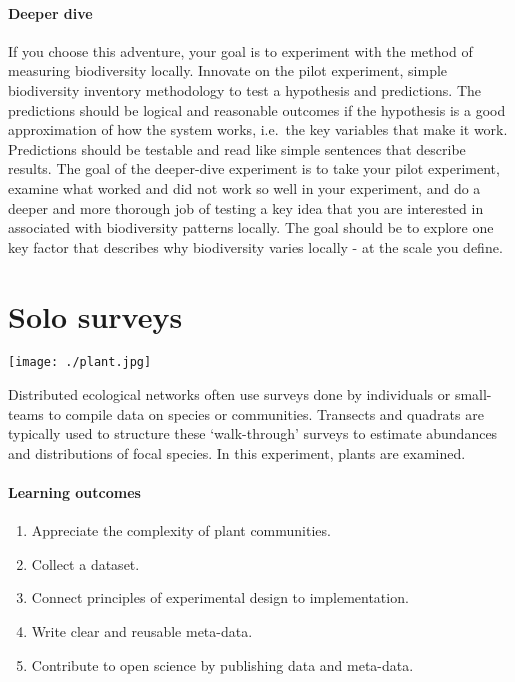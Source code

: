 \documentclass[
]{book}
\providecommand{\tightlist}{%
  \setlength{\itemsep}{0pt}\setlength{\parskip}{0pt}}
\begin{document}
\hypertarget{deeper-dive-1}{%
\subsubsection*{Deeper dive}\label{deeper-dive-1}}

If you choose this adventure, your goal is to experiment with the method of measuring biodiversity locally. Innovate on the pilot experiment, simple biodiversity inventory methodology to test a hypothesis and predictions. The predictions should be logical and reasonable outcomes if the hypothesis is a good approximation of how the system works, i.e.~the key variables that make it work. Predictions should be testable and read like simple sentences that describe results. The goal of the deeper-dive experiment is to take your pilot experiment, examine what worked and did not work so well in your experiment, and do a deeper and more thorough job of testing a key idea that you are interested in associated with biodiversity patterns locally. The goal should be to explore one key factor that describes why biodiversity varies locally - at the scale you define.

\hypertarget{survey}{%
\chapter{Solo surveys}\label{survey}}

\texttt{[image: ./plant.jpg]}

Distributed ecological networks often use surveys done by individuals or small-teams to compile data on species or communities. Transects and quadrats are typically used to structure these `walk-through' surveys to estimate abundances and distributions of focal species. In this experiment, plants are examined.

\hypertarget{learning-outcomes-2}{%
\subsubsection*{Learning outcomes}\label{learning-outcomes-2}}

\begin{enumerate}
\def\labelenumi{\arabic{enumi}.}
\tightlist
\item
  Appreciate the complexity of plant communities.\\
\item
  Collect a dataset.\\
\item
  Connect principles of experimental design to implementation.\\
\item
  Write clear and reusable meta-data.\\
\item
  Contribute to open science by publishing data and meta-data.
\end{enumerate}
\end{document}
